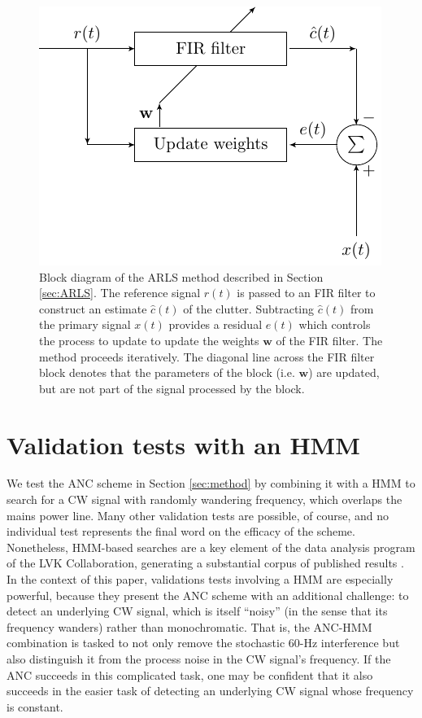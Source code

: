 \documentclass[pra,superscriptaddress,reprint,amsmath,amssymb,nofootinbib]{revtex4-2}
\begin{document}
\begin{figure}
	\begin{center}
		\includegraphics[width=\columnwidth]{images/fir_block_2.pdf}
	\end{center}
	\caption{Block diagram of the ARLS method described in Section \ref{sec:ARLS}. The reference signal $r(t)$ is passed to an FIR filter to construct an estimate $\hat{c}(t)$ of the clutter. Subtracting $\hat{c}(t)$ from the primary signal $x(t)$ provides a residual $e(t)$ which controls the process to update to update the weights $\mathbf{w}$ of the FIR filter. The method proceeds iteratively. The diagonal line across the FIR filter block denotes that the parameters of the block (i.e. $\mathbf{w}$) are updated, but are not part of the signal processed by the block.}
	\label{fig:arlsBlock}
\end{figure}

\section{Validation tests with an HMM} \label{sec:results}
We test the ANC scheme in Section \ref{sec:method} by combining it with a HMM to search for a CW signal with randomly wandering frequency, which overlaps the mains power line. Many other validation tests are possible, of course, and no individual test represents the final word on the efficacy of the scheme. Nonetheless, HMM-based searches are a key element of the data analysis program of the LVK Collaboration, generating a substantial corpus of published results \citep{LIGOMarkov17,LIGOMarkov19,PhysRevD.99.084042,2018PhRvD..97d3013S,LIGOMarkov22,2023PhRvD.107f4062V}. In the context of this paper, validations tests involving a HMM are especially powerful, because they present the ANC scheme with an additional challenge: to detect an underlying CW signal, which is itself ``noisy'' (in the sense that its frequency wanders) rather than monochromatic. That is, the ANC-HMM combination is tasked to not only remove the stochastic 60-Hz interference but also distinguish it from the process noise in the CW signal's frequency. If the ANC succeeds in this complicated task, one may be confident that it also succeeds in the easier task of detecting an underlying CW signal whose frequency is constant.  \newline 
\end{document}
